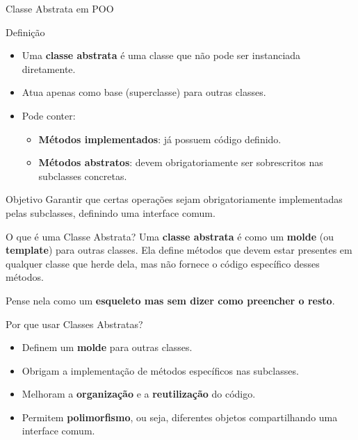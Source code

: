 \begin{frame}{Classe Abstrata em POO}

    \begin{block}{Definição}
        \begin{itemize}
            \item Uma \textbf{classe abstrata} é uma classe que não pode ser instanciada diretamente.
            \item Atua apenas como base (superclasse) para outras classes.
            \item Pode conter:
                  \begin{itemize}
                      \item \textbf{Métodos implementados}: já possuem código definido.
                      \item \textbf{Métodos abstratos}: devem obrigatoriamente ser sobrescritos nas subclasses concretas.
                  \end{itemize}
        \end{itemize}
    \end{block}

    \begin{block}{Objetivo}
        Garantir que certas operações sejam obrigatoriamente implementadas pelas subclasses, definindo uma interface comum.
    \end{block}

\end{frame}

\begin{frame}{O que é uma Classe Abstrata?}
    Uma \textbf{classe abstrata} é como um \textbf{molde} (ou \textbf{template}) para outras classes.
    Ela define métodos que devem estar presentes em qualquer classe que herde dela,
    mas não fornece o código específico desses métodos.

    \vspace{0.3cm}
    Pense nela como um \textbf{esqueleto mas sem dizer como preencher o resto}.
\end{frame}


\begin{frame}{Por que usar Classes Abstratas?}
    \begin{itemize}
        \item Definem um \textbf{molde} para outras classes.
        \item Obrigam a implementação de métodos específicos nas subclasses.
        \item Melhoram a \textbf{organização} e a \textbf{reutilização} do código.
        \item Permitem \textbf{polimorfismo}, ou seja, diferentes objetos
              compartilhando uma interface comum.
    \end{itemize}
\end{frame}


